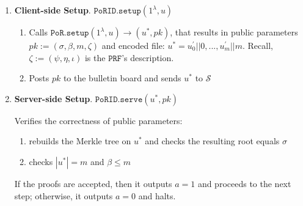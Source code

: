 

\begin{enumerate}
\item\textbf{Client-side Setup}. $\mathtt{PoRID.setup}(1^{\lambda}, u)$
\begin{enumerate}
\item Calls  $\mathtt{PoR.setup}(1^{\lambda}, u)\rightarrow (u^{\scriptscriptstyle *},pk)$, that results in public parameters $pk:=(\sigma,\beta,m,\zeta)$ and encoded file: $u^{\scriptscriptstyle *}=u^{\scriptscriptstyle '}_{\scriptscriptstyle 0}||0,...,u^{\scriptscriptstyle '}_{\scriptscriptstyle m}||m$. Recall,  $\zeta:=(\psi,\eta, \iota)$ is the $\mathtt{PRF}$'s description.

\item Posts $pk$ to the bulletin board and sends $u^{\scriptscriptstyle *}$ to $\mathcal{S}$ 
\end{enumerate}

\item\textbf{Server-side Setup}. $\mathtt{PoRID.serve}(u^{\scriptscriptstyle *},pk)$

Verifies the correctness of public parameters:
\begin{enumerate}
\item rebuilds  the Merkle tree on $u^{\scriptscriptstyle *}$ and checks the resulting root equals $\sigma$
\item checks $|u^{*}|=m$ and  $\beta\leq m$
\end{enumerate}
 If the proofs are accepted, then  it outputs $a = 1$ and proceeds to the next step; otherwise, it outputs $a = 0$ and halts.
 
 


\end{enumerate}
